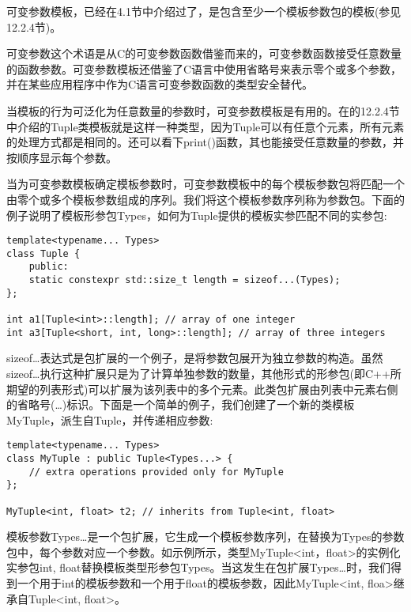 
可变参数模板，已经在4.1节中介绍过了，是包含至少一个模板参数包的模板(参见12.2.4节)。

\begin{tcolorbox}[colback=webgreen!5!white,colframe=webgreen!75!black]
\hspace*{0.75cm}可变参数这个术语是从C的可变参数函数借鉴而来的，可变参数函数接受任意数量的函数参数。可变参数模板还借鉴了C语言中使用省略号来表示零个或多个参数，并在某些应用程序中作为C语言可变参数函数的类型安全替代。
\end{tcolorbox}

当模板的行为可泛化为任意数量的参数时，可变参数模板是有用的。在的12.2.4节中介绍的Tuple类模板就是这样一种类型，因为Tuple可以有任意个元素，所有元素的处理方式都是相同的。还可以看下print()函数，其也能接受任意数量的参数，并按顺序显示每个参数。

当为可变参数模板确定模板参数时，可变参数模板中的每个模板参数包将匹配一个由零个或多个模板参数组成的序列。我们将这个模板参数序列称为参数包。下面的例子说明了模板形参包Types，如何为Tuple提供的模板实参匹配不同的实参包:

\begin{lstlisting}[style=styleCXX]
template<typename... Types>
class Tuple {
	public:
	static constexpr std::size_t length = sizeof...(Types);
};

int a1[Tuple<int>::length]; // array of one integer
int a3[Tuple<short, int, long>::length]; // array of three integers
\end{lstlisting}


sizeof…表达式是包扩展的一个例子，是将参数包展开为独立参数的构造。虽然sizeof…执行这种扩展只是为了计算单独参数的数量，其他形式的形参包(即C++所期望的列表形式)可以扩展为该列表中的多个元素。此类包扩展由列表中元素右侧的省略号(…)标识。下面是一个简单的例子，我们创建了一个新的类模板MyTuple，派生自Tuple，并传递相应参数:

\begin{lstlisting}[style=styleCXX]
template<typename... Types>
class MyTuple : public Tuple<Types...> {
	// extra operations provided only for MyTuple
};

MyTuple<int, float> t2; // inherits from Tuple<int, float>
\end{lstlisting}

模板参数Types…是一个包扩展，它生成一个模板参数序列，在替换为Types的参数包中，每个参数对应一个参数。如示例所示，类型MyTuple<int，float>的实例化实参包int, float替换模板类型形参包Types。当这发生在包扩展Types…时，我们得到一个用于int的模板参数和一个用于float的模板参数，因此MyTuple<int, floa>继承自Tuple<int, float>。

